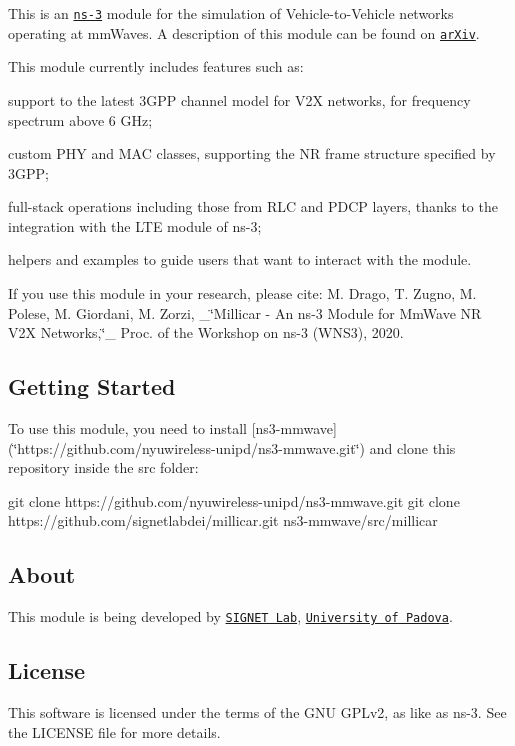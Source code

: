 This is an \href{https://www.nsnam.org}{\tt ns-\/3} module for the simulation of Vehicle-\/to-\/\+Vehicle networks operating at mm\+Waves. A description of this module can be found on \href{https://arxiv.org/abs/2002.10347}{\tt ar\+Xiv}.

This module currently includes features such as\+:
\begin{DoxyItemize}
\item support to the latest 3\+G\+PP channel model for V2X networks, for frequency spectrum above 6 G\+Hz;
\item custom P\+HY and M\+AC classes, supporting the NR frame structure specified by 3\+G\+PP;
\item full-\/stack operations including those from R\+LC and P\+D\+CP layers, thanks to the integration with the L\+TE module of ns-\/3;
\item helpers and examples to guide users that want to interact with the module.
\end{DoxyItemize}

If you use this module in your research, please cite\+: M. Drago, T. Zugno, M. Polese, M. Giordani, M. Zorzi, \+\_\+\char`\"{}\+Millicar -\/ An ns-\/3 Module for Mm\+Wave N\+R V2\+X Networks,\char`\"{}\+\_\+ Proc. of the Workshop on ns-\/3 (W\+N\+S3), 2020.

\subsection*{Getting Started}

To use this module, you need to install \mbox{[}ns3-\/mmwave\mbox{]}(\char`\"{}https\+://github.\+com/nyuwireless-\/unipd/ns3-\/mmwave.\+git\char`\"{}) and clone this repository inside the {\ttfamily src} folder\+:


\begin{DoxyCode}
git clone https://github.com/nyuwireless-unipd/ns3-mmwave.git
git clone https://github.com/signetlabdei/millicar.git ns3-mmwave/src/millicar
\end{DoxyCode}


\subsection*{About}

This module is being developed by \href{http://mmwave.dei.unipd.it/}{\tt S\+I\+G\+N\+ET Lab}, \href{https://www.unipd.it}{\tt University of Padova}.

\subsection*{License}

This software is licensed under the terms of the G\+NU G\+P\+Lv2, as like as ns-\/3. See the L\+I\+C\+E\+N\+SE file for more details. 